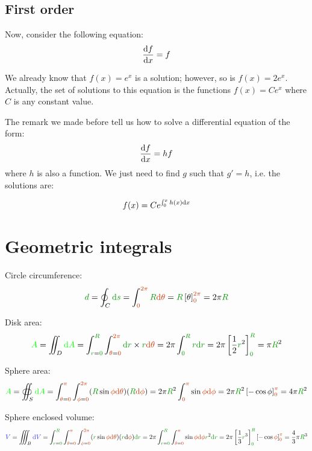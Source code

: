 \subsection{First order}

Now, consider the following equation:
\[
\frac {\mathrm{d} f} {\mathrm{d} x} = f
\]

We already know that $f(x) = e^x$ is a solution; however, so is $f(x) =
2 e^x$. Actually, the set of solutions to this equation is the functions
$f(x) = C e^x$ where $C$ is any constant value.

The remark we made before tell us how to solve a differential equation
of the form:
\[
\frac {\mathrm{d} f} {\mathrm{d} x} = h f
\]
where $h$ is also a function. We just need to find $g$ such that $g' =
h$, i.e. the solutions are:

\[
f(x) = C e^{\int_0^x h(x) \mathrm{d} x}
\]


\section{Geometric integrals}

Circle circumference:
\[
\dist{d}
= \oint_C \dist{\d s}
= \int_{\angle{0}}^{\angle{2\pi}} \dist{R} \angle{\d \theta}
= \dist{R} \left[ \theta \right]_{\angle{0}}^{\angle{2\pi}}
= 2\pi \dist{R}
\]

Disk area:
\[
\area{A}
= \iint_D \area{\d A}
= \int_{\dist{r}=\dist{0}}^{\dist{R}}
  \int_{\angle{\theta}=\angle{0}}^{\angle{2\pi}}
  \dist{\d r} \times \dist{r} \angle{\d \theta}
= 2\pi \int_{\dist{0}}^{\dist{R}} \dist{r} \dist{\d r}
= 2\pi \left[\frac 1 2 \dist{r}^2\right]_{\dist{0}}^{\dist{R}}
= \pi \dist{R}^2
\]

Sphere area:
\[
\area{A}
= \oiint_S \area{\d A}
= \int_{\angle{\theta}=\angle{0}}^{\angle{\pi}}
  \int_{\angle{\phi}=\angle{0}}^{\angle{2\pi}}
  (\dist{R} \sin \angle{\phi} \angle{\d \theta})
  (\dist{R} \angle{\d \phi})
= 2\pi \dist{R}^2 \int_{\angle{0}}^{\angle{\pi}} \sin \angle{\phi} \angle{\d \phi}
= 2\pi \dist{R}^2 \left[ - \cos \phi \right]_{\angle{0}}^{\angle{\pi}}
= 4\pi \dist{R}^2
\]

Sphere enclosed volume:
\[
\vol{V}
= \iiint_B \vol{\d V}
= \int_{\dist{r}=\dist{0}}^{\dist{R}}
  \int_{\angle{\theta}=\angle{0}}^{\angle{\pi}}
  \int_{\angle{\phi}=\angle{0}}^{\angle{2\pi}}
  (\dist{r} \sin \angle{\phi} \angle{\d \theta}) (\dist{r} \d \angle{\phi}) \dist{\d r}
= 2 \pi
  \int_{\dist{r}=\dist{0}}^{\dist{R}}
  \int_{\angle{\theta}=\angle{0}}^{\angle{\pi}} \sin \angle{\phi} \angle{\d \phi} \dist{r}^2 \dist{\d r}
= 2 \pi
  \left[\frac 1 3 \dist{r}^3\right]_{\dist{0}}^{\dist{R}}
  \left[- \cos \angle{\phi}\right]_{\angle{0}}^{\angle{\pi}}
= \frac 4 3 \pi \dist{R}^3
\]
